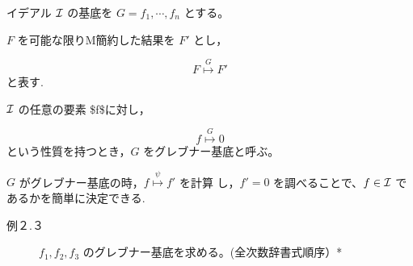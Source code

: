 \documentclass[a4j]{jarticle}
\begin{document}
イデアル \({\cal I}\) の基底を \(G={f_1,\cdots,f_n}\) とする。

\(F\) を可能な限りM簡約した結果を \(F'\) とし，

$$F \stackrel{G}{\longmapsto} F'$$ と表す.

\({\cal I}\) の任意の要素 \$f\$に対し，

$$f \stackrel{G}{\longmapsto} 0$$
という性質を持つとき，\(G\) をグレブナー基底と呼ぶ。

\(G\) がグレブナー基底の時，\(f \stackrel{\psi}{\longmapsto} f'\) を計算
し，\(f'=0\) を調べることで、\(f \in {\cal I}\) であるかを簡単に決定できる.

\begin{description}
\item[{例２.３}] \(f_1,f_2,f_3\) のグレブナー基底を求める。(全次数辞書式順序）*
\end{description}
\end{document}
